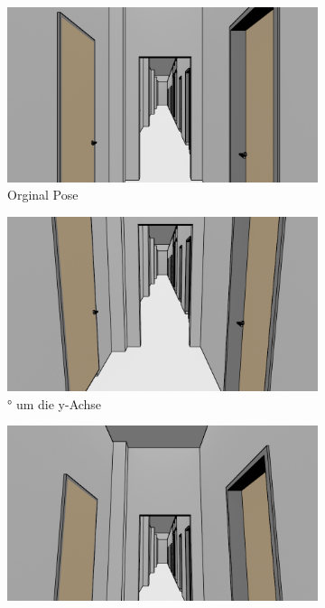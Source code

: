 \begin{figure}
	\centering
	\begin{subfigure}[t]{0.18\linewidth}
		\centering
		\includegraphics[width=\linewidth]{images/syn_dataset/00023.png}
		\caption{\RaggedRight Orginal Pose \vspace{\fill}}
		\label{subfig:iz0_y0}
	\end{subfigure}
	\hfill 
	\begin{subfigure}[t]{0.18\linewidth}
		\centering
		\includegraphics[width=\linewidth]{images/syn_dataset/00021.png}
		\caption{° um die y-Achse}
		\label{subfig:iz0_y-10}
	\end{subfigure}
	\hfill
	\begin{subfigure}[t]{0.18\linewidth}
		\centering
		\includegraphics[width=\linewidth]{images/syn_dataset/00020.png}

\end{subfigure}
\end{figure}
